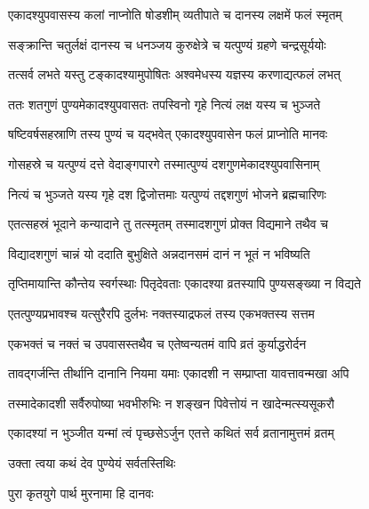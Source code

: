 \twolineshloka
{एकादश्युपवासस्य कलां नाप्नोति षोडशीम्}
{व्यतीपाते च दानस्य लक्षमें फलं स्मृतम्} %

\twolineshloka
{सङ्क्रान्ति चतुर्लक्षं दानस्य च धनञ्जय}
{कुरुक्षेत्रे च यत्पुण्यं ग्रहणे चन्द्रसूर्ययोः} %

\twolineshloka
{तत्सर्व लभते यस्तु टङ्कादश्यामुपोषितः}
{अश्वमेधस्य यज्ञस्य करणाद्यत्फलं लभत्} %

\twolineshloka
{ततः शतगुणं पुण्यमेकादश्युपवासतः}
{तपस्विनो गृहे नित्यं लक्ष यस्य च भुञ्जते} %

\twolineshloka
{षष्टिवर्षसहस्राणि तस्य पुण्यं च यद्भवेत्}
{एकादश्युपवासेन फलं प्राप्नोति मानवः} %

\twolineshloka
{गोसहस्रे च यत्पुण्यं दत्ते वेदाङ्गपारगे}
{तस्मात्पुण्यं दशगुणमेकादश्युपवासिनाम्} %

\twolineshloka
{नित्यं च भुञ्जते यस्य गृहे दश द्विजोत्तमाः}
{यत्पुण्यं तद्दशगुणं भोजने ब्रह्मचारिणः} %

\twolineshloka
{एतत्सहस्रं भूदाने कन्यादाने तु तत्स्मृतम्}
{तस्मादशगुणं प्रोक्त विद्यमाने तथैव च} %

\twolineshloka
{विद्यादशगुणं चान्नं यो ददाति बुभुक्षिते}
{अन्नदानसमं दानं न भूतं न भविष्यति} %

\twolineshloka
{तृप्तिमायान्ति कौन्तेय स्वर्गस्थाः पितृदेवताः}
{एकादश्या व्रतस्यापि पुण्यसङ्ख्या न विद्यते} %

\twolineshloka
{एतत्पुण्यप्रभावश्च यत्सुरैरपि दुर्लभः}
{नक्तस्याद्रफलं तस्य एकभक्तस्य सत्तम} %

\twolineshloka
{एकभक्तं च नक्तं च उपवासस्तथैव च}
{एतेष्वन्यतमं वापि व्रतं कुर्याद्धरोर्दन} %

\twolineshloka
{तावद्गर्जन्ति तीर्थानि दानानि नियमा यमाः}
{एकादशी न सम्प्राप्ता यावत्तावन्मखा अपि} %

\twolineshloka
{तस्मादेकादशी सर्वैरुपोष्या भवभीरुभिः}
{न शङ्खन पिवेत्तोयं न खादेन्मत्स्यसूकरौ} %

\twolineshloka
{एकादश्यां न भुञ्जीत यन्मां त्वं पृच्छसेऽर्जुन}
{एतत्ते कथितं सर्व व्रतानामुत्तमं व्रतम्} %



\onelineshloka
{उक्ता त्वया कथं देव पुण्येयं सर्वतस्तिथिः} %



\onelineshloka
{पुरा कृतयुगे पार्थ मुरनामा हि दानवः} %

